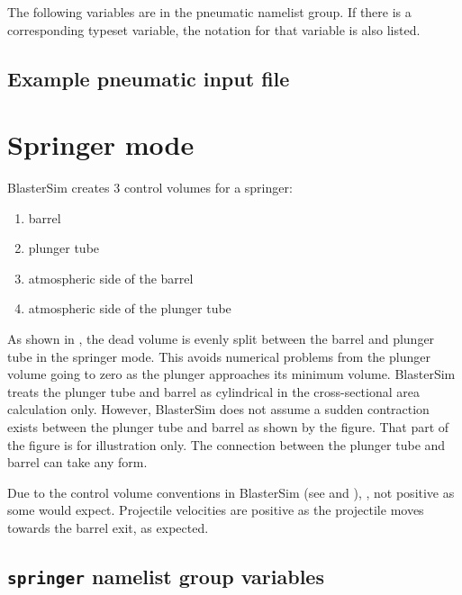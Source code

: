 The following variables are in the pneumatic namelist group.
If there is a corresponding typeset variable, the notation for that variable is also listed.



\subsection{Example pneumatic input file}\label{pneumatic-example}



\section{Springer mode}\label{springer}

BlasterSim creates 3 control volumes for a springer:
\begin{enumerate}
\item barrel
\item plunger tube
\item atmospheric side of the barrel
\item atmospheric side of the plunger tube
\end{enumerate}

As shown in , the dead volume is evenly split between the barrel and plunger tube in the springer mode.
This avoids numerical problems from the plunger volume going to zero as the plunger approaches its minimum volume.
BlasterSim treats the plunger tube and barrel as cylindrical in the cross-sectional area calculation only.
However, BlasterSim does not assume a sudden contraction exists between the plunger tube and barrel as shown by the figure.
That part of the figure is for illustration only.
The connection between the plunger tube and barrel can take any form.

Due to the control volume conventions in BlasterSim (see  and ), , not positive as some would expect.
Projectile velocities are positive as the projectile moves towards the barrel exit, as expected.



\subsection{\texttt{springer} namelist group variables}\label{springer-namelist}

